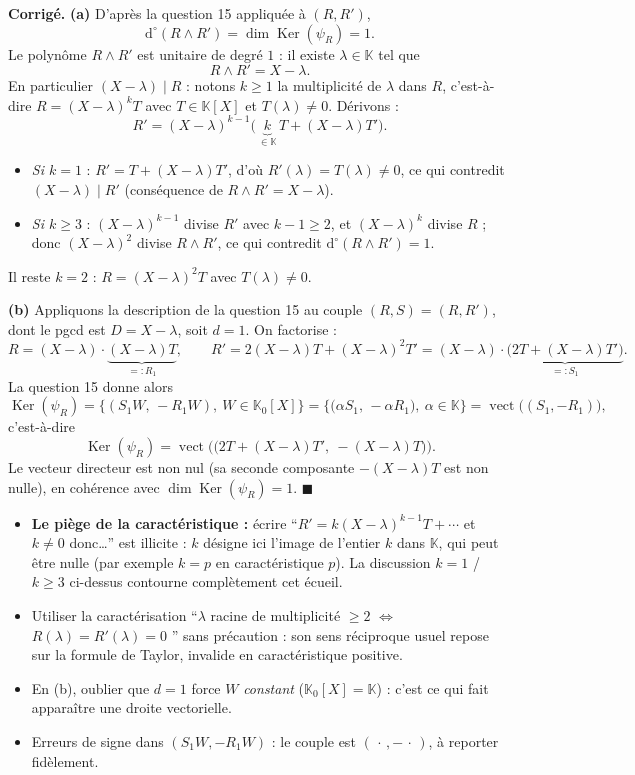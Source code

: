 \documentclass[11pt,a4paper]{article}
\newenvironment{corrige}
  {\par\medskip\noindent
   \begin{tcolorbox}[blanker, breakable,
     borderline west={2.5pt}{0pt}{vertP},
     left=10pt, top=2pt, bottom=2pt]
   {\color{vertP}\bfseries Corrigé.}\hspace{0.5em}\ignorespaces}
  {\hfill$\blacksquare$\end{tcolorbox}\medskip}
\newcommand{\og}{``}
\newcommand{\fg}{''}
\newcommand{\K}{\mathbb{K}}
\newcommand{\dg}[1]{\mathrm{d}^{\circ}\!\left(#1\right)}
\DeclareMathOperator{\Ker}{Ker}
\DeclareMathOperator{\vect}{vect}
\begin{document}
\begin{corrige}
\textbf{(a)} D'après la question 15 appliquée à $(R,R')$,
\[
\dg{R\wedge R'}=\dim\Ker(\psi_R)=1 .
\]
Le polynôme $R\wedge R'$ est unitaire de degré $1$ : il existe
$\lambda\in\K$ tel que
\[
R\wedge R'=X-\lambda .
\]
En particulier $(X-\lambda)\mid R$ : notons $k\ge 1$ la multiplicité
de $\lambda$ dans $R$, c'est-à-dire $R=(X-\lambda)^{k}T$ avec
$T\in\K[X]$ et $T(\lambda)\neq 0$. Dérivons :
\[
R'=(X-\lambda)^{k-1}\big(\,\underbrace{k}_{\in\K}\,T
+(X-\lambda)T'\big).
\]
\begin{itemize}[leftmargin=1.6em, itemsep=1pt]
\item \emph{Si $k=1$} : $R'=T+(X-\lambda)T'$, d'où
$R'(\lambda)=T(\lambda)\neq 0$, ce qui contredit
$(X-\lambda)\mid R'$ (conséquence de $R\wedge R'=X-\lambda$).
\item \emph{Si $k\ge 3$} : $(X-\lambda)^{k-1}$ divise $R'$ avec
$k-1\ge 2$, et $(X-\lambda)^{k}$ divise $R$ ; donc
$(X-\lambda)^{2}$ divise $R\wedge R'$, ce qui contredit
$\dg{R\wedge R'}=1$.
\end{itemize}
Il reste $k=2$ :
$R=(X-\lambda)^{2}T$ avec $T(\lambda)\neq 0$.

\textbf{(b)} Appliquons la description de la question 15 au couple
$(R,S)=(R,R')$, dont le pgcd est $D=X-\lambda$, soit $d=1$. On
factorise :
\[
R=(X-\lambda)\cdot\underbrace{(X-\lambda)T}_{=:R_1},
\qquad
R'=2(X-\lambda)T+(X-\lambda)^{2}T'
=(X-\lambda)\cdot\underbrace{\big(2T+(X-\lambda)T'\big)}_{=:S_1}.
\]
La question 15 donne alors
\[
\Ker(\psi_R)
=\big\{(S_1W,\,-R_1W),\ W\in\K_{0}[X]\big\}
=\big\{\big(\alpha S_1,\,-\alpha R_1\big),\ \alpha\in\K\big\}
=\vect\big((S_1,-R_1)\big),
\]
c'est-à-dire
\[
\boxed{\ \Ker(\psi_R)
=\vect\Big(\big(2T+(X-\lambda)T',\ -(X-\lambda)T\big)\Big).\ }
\]
Le vecteur directeur est non nul (sa seconde composante
$-(X-\lambda)T$ est non nulle), en cohérence avec
$\dim\Ker(\psi_R)=1$.
\end{corrige}

\begin{pieges}
\begin{itemize}[leftmargin=1.4em, itemsep=2pt]
\item \textbf{Le piège de la caractéristique :} écrire
\og $R'=k(X-\lambda)^{k-1}T+\cdots$ et $k\neq 0$ donc\dots \fg{} est
illicite : $k$ désigne ici l'image de l'entier $k$ dans $\K$, qui
peut être nulle (par exemple $k=p$ en caractéristique $p$). La
discussion $k=1$ / $k\ge 3$ ci-dessus contourne complètement cet
écueil.
\item Utiliser la caractérisation \og $\lambda$ racine de multiplicité
$\ge 2$ $\iff$ $R(\lambda)=R'(\lambda)=0$ \fg{} sans précaution :
son sens réciproque usuel repose sur la formule de Taylor, invalide
en caractéristique positive.
\item En (b), oublier que $d=1$ force $W$ \emph{constant}
($\K_0[X]=\K$) : c'est ce qui fait apparaître une droite
vectorielle.
\item Erreurs de signe dans $(S_1W,-R_1W)$ : le couple est
$(\,\cdot\,,-\,\cdot\,)$, à reporter fidèlement.
\end{itemize}
\end{pieges}
\end{document}
